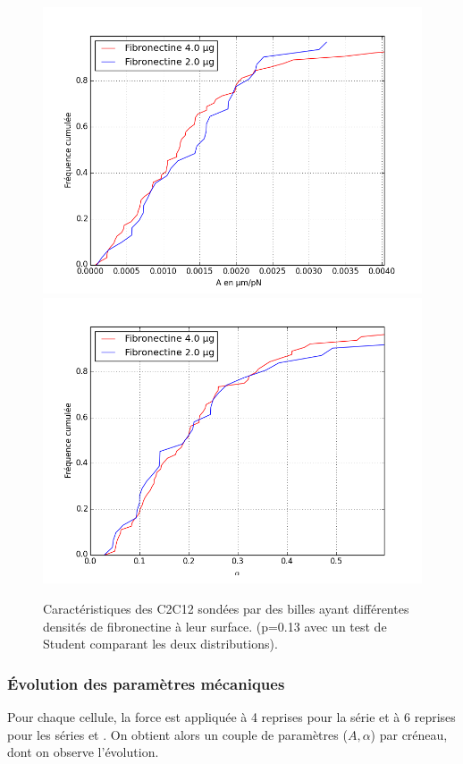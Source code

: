 \begin{figure}
\includegraphics[scale=0.5]{Figures/A_coating_seul.png} 
\includegraphics[scale=0.5]{Figures/E_coating_seul.png} 
\caption{Caractéristiques des C2C12 sondées par des billes ayant différentes densités de fibronectine à leur surface. (p=0.13 avec un test de Student comparant les deux distributions). }
\end{figure}

\subsubsection{\'Evolution des paramètres mécaniques}

Pour chaque cellule, la force est appliquée à 4 reprises pour la série  et à 6 reprises pour les séries  et . On obtient alors un couple de paramètres ($A,\alpha$) par créneau, dont on observe l'évolution. 

